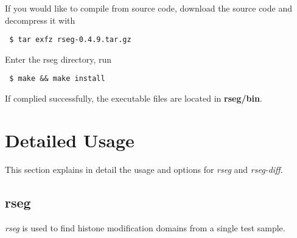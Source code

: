 \documentclass[11pt]{report}
\begin{document}
If you would like to compile from source code, download the source
code and decompress it with
\begin{verbatim}
 $ tar exfz rseg-0.4.9.tar.gz
\end{verbatim}
%
Enter the rseg directory, run
\begin{verbatim}
 $ make && make install
\end{verbatim}
If complied successfully, the executable files are located in \textbf{rseg/bin}.

\section{Detailed Usage}
\label{sec:usage-detail}

This section explains in detail the usage and options for
\textit{rseg} and \textit{rseg-diff}.

\subsection{rseg}
\label{sec:rseg-detail}

\textit{rseg} is used to find histone modification domains from a
single test sample. 
\end{document}
